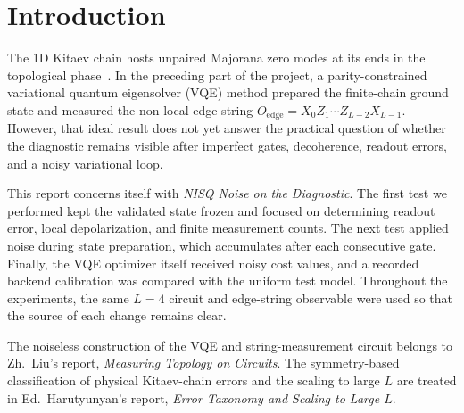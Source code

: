 %

\section{Introduction}
\label{sec:intro}

The 1D Kitaev chain hosts unpaired Majorana zero modes at its ends in the
topological phase~\cite{kitaev2001}.
In the preceding part of the project, a parity-constrained variational
quantum eigensolver (VQE) method prepared the finite-chain ground state and measured the
non-local edge string $O_{\mathrm{edge}}=X_0Z_1\cdots Z_{L-2}X_{L-1}$.  However, that
ideal result does not yet answer the practical question of whether the
diagnostic remains visible after imperfect gates, decoherence, readout errors,
and a noisy variational loop.

This report concerns itself with \emph{NISQ Noise on the Diagnostic}.  The first test we performed kept
the validated state frozen and focused on determining readout error, local depolarization, and
finite measurement counts.  The next test applied noise during state
preparation, which accumulates after each consecutive gate.  Finally, the VQE
optimizer itself received noisy cost values, and a recorded backend calibration
was compared with the uniform test model.  Throughout the experiments, the same $L=4$ circuit
and edge-string observable were used so that the source of each change remains
clear.

The noiseless construction of the VQE and string-measurement circuit belongs
to Zh.\ Liu's report, \emph{Measuring Topology on Circuits}.  The
symmetry-based classification of physical Kitaev-chain errors and the scaling to
large $L$ are treated in Ed.\ Harutyunyan's report, \emph{Error Taxonomy and
Scaling to Large $L$}.  
